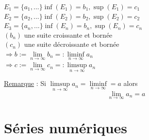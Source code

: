 \documentclass[12pt,a4paper]{article}
\newcommand{\limite}{\lim\limits_}
\newcommand{\ninf}{\ensuremath{n \to \infty}}
\begin{document}
{\begin{boite}
$E_1 = \{a_1,...\} \inf(E_1) = b_1, \sup(E_1) = c_1$\\
$E_2 = \{a_2,...\} \inf(E_2) = b_2, \sup(E_2) = c_2$\\
$E_3 = \{a_n,...\} \inf(E_n) = b_n, \sup(E_n) = c_n$\\
$(b_n)$ une suite croissante et bornée\\
$(c_n)$ une suite décroissante et bornée\\
$\Rightarrow b := \limite{\ninf} b_n =: \liminf\limits_{\ninf} a_n$\\
$\Rightarrow c := \limite{\ninf} c_n =: \limsup\limits_{\ninf} a_n$\\
\end{boite}
\begin{boite}
\underline{Remarque} : Si $\limsup\limits_{\ninf} a_n = \liminf\limits_{\ninf} = a$ alors 
\begin{equation}
\limite{\ninf} a_n =a
\end{equation}
\end{boite}
\section{Séries numériques}
\setcounter{equation}{0}
}
\end{document}
